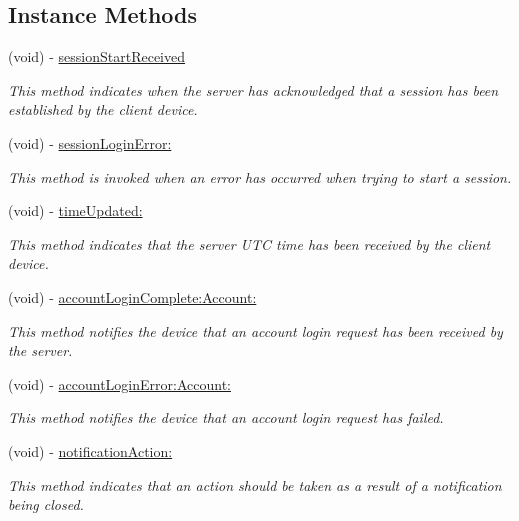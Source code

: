 \subsection*{Instance Methods}
\begin{DoxyCompactItemize}
\item 
(void) -\/ \hyperlink{protocol_fuse_delegate-p_a4278f68e73dc20a7a24b331959a1872c}{session\+Start\+Received}
\begin{DoxyCompactList}\small\item\em This method indicates when the server has acknowledged that a session has been established by the client device. \end{DoxyCompactList}\item 
(void) -\/ \hyperlink{protocol_fuse_delegate-p_ada4bf22b446c79333c9fd15b39121603}{session\+Login\+Error\+:}
\begin{DoxyCompactList}\small\item\em This method is invoked when an error has occurred when trying to start a session. \end{DoxyCompactList}\item 
(void) -\/ \hyperlink{protocol_fuse_delegate-p_a85c5468cf940315584698956edcbbdfd}{time\+Updated\+:}
\begin{DoxyCompactList}\small\item\em This method indicates that the server U\+T\+C time has been received by the client device. \end{DoxyCompactList}\item 
(void) -\/ \hyperlink{protocol_fuse_delegate-p_a54a18530604a7ceeb0e9419fc7fa3345}{account\+Login\+Complete\+:\+Account\+:}
\begin{DoxyCompactList}\small\item\em This method notifies the device that an account login request has been received by the server. \end{DoxyCompactList}\item 
(void) -\/ \hyperlink{protocol_fuse_delegate-p_adfc133048b19e5c4b78c02c7bb418e5d}{account\+Login\+Error\+:\+Account\+:}
\begin{DoxyCompactList}\small\item\em This method notifies the device that an account login request has failed. \end{DoxyCompactList}\item 
(void) -\/ \hyperlink{protocol_fuse_delegate-p_afc6afbdf6a149756eb2dca5e0fd64b77}{notification\+Action\+:}
\begin{DoxyCompactList}\small\item\em This method indicates that an action should be taken as a result of a notification being closed. \end{DoxyCompactList}\item 

\end{DoxyCompactItemize}
